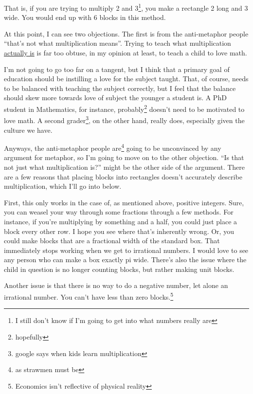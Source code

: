\documentclass[12pt]{article}[titlepage]
\newcommand{\say}[1]{``#1''}
\newcommand{\1}{\={a}}
\newcommand{\2}{\={e}}
\newcommand{\3}{\={\i}}
\newcommand{\4}{\=o}
\newcommand{\5}{\=u}
\newcommand{\6}{\={A}}
\renewcommand{\,}{\textsuperscript{,}}
\begin{document}
That is, if you are trying to multiply 2 and 3\footnote{I still don't know if I'm going to get into what numbers really are}, you make a rectangle 2 long and 3 wide.
You would end up with 6 blocks in this method.

At this point, I can see two objections.
The first is from the anti-metaphor people \say{that's not what multiplication means}.
Trying to teach what multiplication \href{https://web.archive.org/web/20220420205104/https://www.maa.org/external_archive/devlin/devlin_01_11.html}{actually is} is far too obtuse, in my opinion at least, to teach a child to love math.

I'm not going to go too far on a tangent, but I think that a primary goal of education should be instilling a love for the subject taught.
That, of course, needs to be balanced with teaching the subject correctly, but I feel that the balance should skew more towards love of subject the younger a student is.
A PhD student in Mathematics, for instance, probably\footnote{hopefully} doesn't need to be motivated to love math.
A second grader\footnote{google says when kids learn multiplication}, on the other hand, really does, especially given the culture we have.

Anyways, the anti-metaphor people are\footnote{as strawmen must be} going to be unconvinced by any argument for metaphor, so I'm going to move on to the other objection.
\say{Is that not just what multiplication is?} might be the other side of the argument.
There are a few reasons that placing blocks into rectangles doesn't accurately describe multiplication, which I'll go into below.

First, this only works in the case of, as mentioned above, positive integers.
Sure, you can weasel your way through some fractions through a few methods.
For instance, if you're multiplying by something and a half, you could just place a block every other row.
I hope you see where that's inherently wrong.
Or, you could make blocks that are a fractional width of the standard box.
That immediately stops working when we get to irrational numbers.
I would love to see any person who can make a box exactly pi wide.
There's also the issue where the child in question is no longer counting blocks, but rather making unit blocks.

Another issue is that there is no way to do a negative number, let alone an irrational number.
You can't have less than zero blocks.\footnote{Economics isn't reflective of physical reality}
\end{document}
